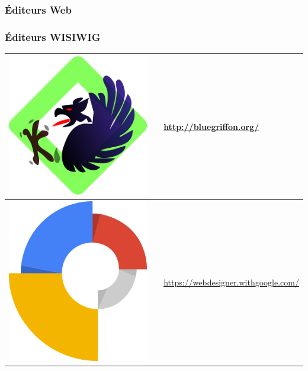 \documentclass[xcolor=table]{beamer}
\begin{document}
\begin{frame}
\frametitle{Éditeurs Web}
\frametitle{Éditeurs WISIWIG}

\def\arraystretch{0}

\begin{tabular}{p{}cp{}}%
	
	\hline
	
	\includegraphics[height=.8cm]{..//img/Bweb08-dev-web/bluegriffon-logo.png} &
	& 
	\url{http://bluegriffon.org/}\\
	
	\hline
	
	\includegraphics[height=.8cm]{..//img/Bweb08-dev-web/google-web-designer-logo.png} &
	& 
	\url{https://webdesigner.withgoogle.com/} \\
	
	\hline
	
\end{tabular}

\end{frame}
\end{document}
